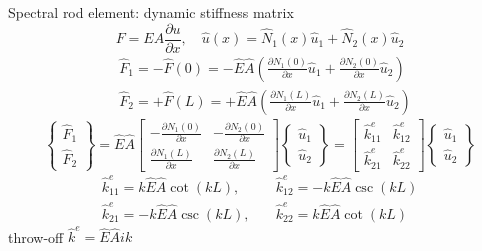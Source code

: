 \documentclass[10pt,aspectratio=169,notes]{beamer} %
\begin{document}
\note{
}
\begin{frame}[t]{Spectral rod element: dynamic stiffness matrix}
\begin{equation*}
F= EA \frac{\partial u}{\partial x}, \quad \hat{u}(x) = \hat{N}_1(x) \hat{u}_1 + \hat{N}_2(x) \hat{u}_2
\end{equation*}
\begin{align*}
& \hat{F}_1 = -\hat{F}(0) = -\hat{E}\hat{A} \left( \frac{\partial N_1(0)}{\partial x} \hat{u}_1 +  \frac{\partial N_2(0)}{\partial x} \hat{u}_2 \right)\\
& \hat{F}_2 = +\hat{F}(L) = +\hat{E}\hat{A} \left( \frac{\partial N_1(L)}{\partial x} \hat{u}_1 +  \frac{\partial N_2(L)}{\partial x} \hat{u}_2 \right)
\end{align*}	
\begin{equation*}
\left\{
	\begin{array}{c}
	\hat{F}_1 \\ 
	\hat{F}_2 
	\end{array} 
	\right\} = \hat{E}\hat{A}  
     \left[  
     \begin{array}{rr}
      - \frac{\partial N_1(0)}{\partial x}  &  - \frac{\partial N_2(0)}{\partial x}  \\
       \frac{\partial N_1(L)}{\partial x}  &  \frac{\partial N_2(L)}{\partial x} 
       \end{array}
       \right]
       \left\{ \begin{array}{l}\hat{u}_1 \\ \hat{u}_2\end{array}\right\} = 
       \left[  \begin{array}{ll} \hat{k}_{11}^e & \hat{k}_{12}^e\\
       \hat{k}_{21}^e & \hat{k}_{22}^e \end{array}\right]
       \left\{ \begin{array}{l} \hat{u}_1 \\ \hat{u}_2\end{array}\right\}
\end{equation*}
\begin{equation*}
\begin{array}{ll}
 \hat{k}_{11}^e = k \hat{E}\hat{A} \cot (k L), \quad &\hat{k}_{12}^e = -k \hat{E}\hat{A} \csc (k L)\\
 \hat{k}_{21}^e =-k \hat{E}\hat{A} \csc (k L), \quad &\hat{k}_{22}^e = k \hat{E}\hat{A} \cot (k L)
\end{array}
\end{equation*}
throw-off \(\hat{k}^e = \hat{E} \hat{A} i k \)
\end{frame}
\end{document}
